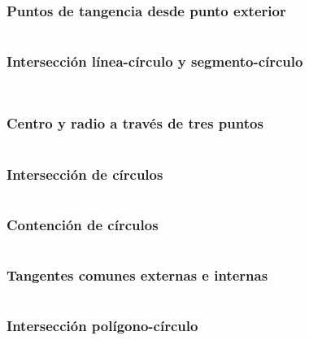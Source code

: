\documentclass[11pt]{article}
\begin{document}
			\subsubsection{Puntos de tangencia desde punto exterior}
			\inputminted[tabsize=2,breaklines,firstline=331,lastline=337,fontsize=\small]{c++}{geometry.cpp}
			
			\subsubsection{Intersección línea-círculo y segmento-círculo}
			\inputminted[tabsize=2,breaklines,firstline=339,lastline=349,fontsize=\small]{c++}{geometry.cpp}
			\inputminted[tabsize=2,breaklines,firstline=351,lastline=358,fontsize=\small]{c++}{geometry.cpp}
			
			\subsubsection{Centro y radio a través de tres puntos}
			\inputminted[tabsize=2,breaklines,firstline=360,lastline=365,fontsize=\small]{c++}{geometry.cpp}
			
			\subsubsection{Intersección de círculos}
			\inputminted[tabsize=2,breaklines,firstline=367,lastline=382,fontsize=\small]{c++}{geometry.cpp}
			
			\subsubsection{Contención de círculos}
			\inputminted[tabsize=2,breaklines,firstline=384,lastline=403,fontsize=\small]{c++}{geometry.cpp}
			
			\subsubsection{Tangentes comunes externas e internas}
			\inputminted[tabsize=2,breaklines,firstline=405,lastline=417,fontsize=\small]{c++}{geometry.cpp}
			
			\subsubsection{Intersección polígono-círculo}
			\inputminted[tabsize=2,breaklines,firstline=419,lastline=454,fontsize=\small]{c++}{geometry.cpp}
			
\end{document}
